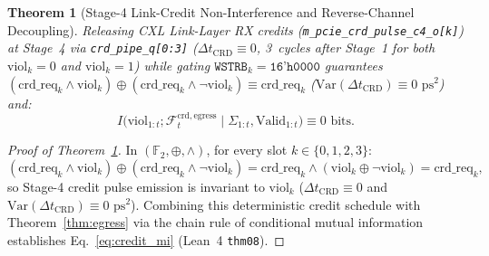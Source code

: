 \documentclass[10pt,twocolumn]{article}
\theoremstyle{spectralthm}
\newtheorem{theorem}{Theorem}[section]
\begin{document}
\begin{theorem}[Stage-4 Link-Credit Non-Interference and Reverse-Channel Decoupling]
\label{thm:credit}
Releasing CXL Link-Layer RX credits (\texttt{m\_pcie\_crd\_pulse\_c4\_o[k]}) at Stage~4 via \texttt{crd\_pipe\_q[0:3]} ($\Delta t_{\mathrm{CRD}} \equiv 0$, 3~cycles after Stage~1 for both $\mathrm{viol}_k = 0$ and $\mathrm{viol}_k = 1$) while gating $\texttt{WSTRB}_k = \texttt{16'h0000}$ guarantees $(\mathrm{crd\_req}_k \wedge \mathrm{viol}_k) \oplus (\mathrm{crd\_req}_k \wedge \neg\mathrm{viol}_k) \equiv \mathrm{crd\_req}_k$ ($\mathrm{Var}(\Delta t_{\mathrm{CRD}}) \equiv 0\text{~ps}^2$) and:
\begin{equation}
\label{eq:credit_mi}
I\bigl(\mathrm{viol}_{1:t}; \mathcal{F}_t^{\mathrm{crd,egress}} \;\big|\; \Sigma_{1:t}, \mathrm{Valid}_{1:t}\bigr) \equiv 0\text{~bits}.
\end{equation}
\end{theorem}
\begin{proof}[Proof of Theorem~\ref{thm:credit}]
In $(\mathbb{F}_2, \oplus, \wedge)$, for every slot $k \in \{0,1,2,3\}$:
\[
(\mathrm{crd\_req}_k \wedge \mathrm{viol}_k) \oplus (\mathrm{crd\_req}_k \wedge \neg\mathrm{viol}_k)
  = \mathrm{crd\_req}_k \wedge (\mathrm{viol}_k \oplus \neg\mathrm{viol}_k)
  = \mathrm{crd\_req}_k,
\]
so Stage-4 credit pulse emission is invariant to $\mathrm{viol}_k$ ($\Delta t_{\mathrm{CRD}} \equiv 0$ and $\mathrm{Var}(\Delta t_{\mathrm{CRD}}) \equiv 0\text{~ps}^2$). Combining this deterministic credit schedule with Theorem~\ref{thm:egress} via the chain rule of conditional mutual information establishes Eq.~\eqref{eq:credit_mi} (Lean~4 \texttt{thm08}).
\end{proof}
\end{document}
